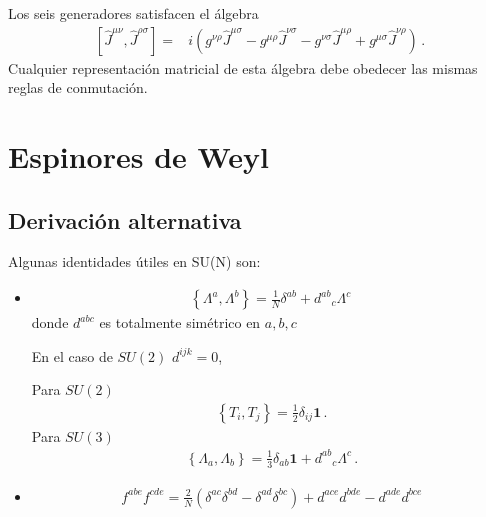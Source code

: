 Los seis generadores satisfacen el álgebra
\begin{align}
\label{eq:lrtalg}
  \left[\widehat{J}^{\mu\nu},\widehat{J}^{\rho\sigma}\right]=&
i(g^{\nu\rho}\widehat{J}^{\mu\sigma}-g^{\mu\rho}\widehat{J}^{\nu\sigma}-g^{\nu\sigma}\widehat{J}^{\mu\rho}+g^{\mu\sigma}\widehat{J}^{\nu\rho})\,.
\end{align}
Cualquier representación matricial de esta álgebra debe obedecer las mismas reglas de conmutación.

\chapter{Espinores de Weyl}

\section{Derivación alternativa}







Algunas identidades útiles en SU(N) son:

\begin{itemize}
\item 
\begin{align}
  \left\{ \Lambda^{a},\Lambda^{b} \right\}=\frac{1}{N}\delta^{ab}+{d^{ab}}_c \Lambda^{c}\,
\end{align}
donde $d^{abc}$ es totalmente simétrico en $a,b,c$

 En el caso de $SU(2)$ $d^{ijk}=0$, 

Para  $SU(2)$
\begin{align}
\left\{T_i,T_j\right\}=\frac{1}{2}\delta_{ij}\mathbf{1}\,.
\end{align}
Para  $SU(3)$
\begin{align}
\left\{\Lambda_a,\Lambda_b\right\}=\frac{1}{3}\delta_{ab}\mathbf{1}+{d^{ab}}_c \Lambda^{c}\,.
\end{align}

\item 
\begin{align}
  f^{abe}f^{cde}=\frac{2}{N}(\delta^{ac}\delta^{bd}-
 \delta^{ad}\delta^{bc})+d^{ace}d^{bde}-d^{ade}d^{bce}
\end{align}
\end{itemize}



